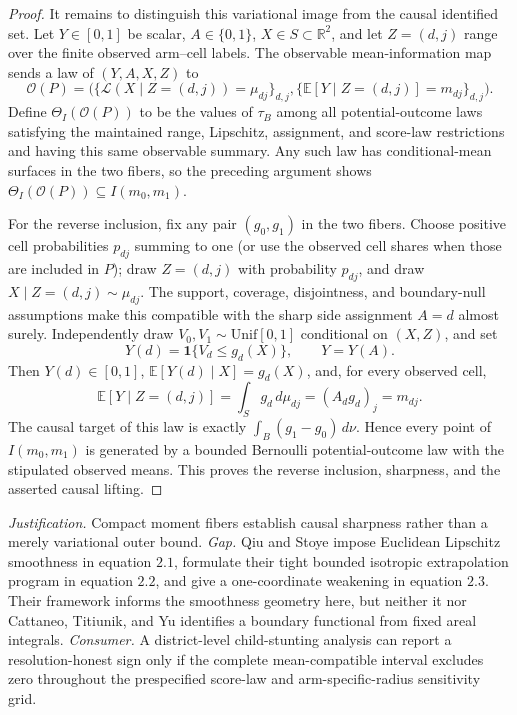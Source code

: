 \documentclass{article}
\begin{document}
\begin{proof}
It remains to distinguish this variational image from the causal identified set.
Let \(Y\in[0,1]\) be scalar, \(A\in\{0,1\}\),
\(X\in S\subset\mathbb R^2\), and let \(Z=(d,j)\) range over the finite observed
arm--cell labels.  The observable mean-information map sends a law of
\((Y,A,X,Z)\) to
\[
 \mathcal O(P)=\bigl(\{\mathcal L(X\mid Z=(d,j))=\mu_{dj}\}_{d,j},
                    \{\mathbb E[Y\mid Z=(d,j)]=m_{dj}\}_{d,j}\bigr).
\]
Define \(\Theta_I(\mathcal O(P))\) to be the values of \(\tau_B\) among all
potential-outcome laws satisfying the maintained range, Lipschitz, assignment,
and score-law restrictions and having this same observable summary.  Any such
law has conditional-mean surfaces in the two fibers, so the preceding argument
shows
\(\Theta_I(\mathcal O(P))\subseteq I(m_0,m_1)\).

For the reverse inclusion, fix any pair \((g_0,g_1)\) in the two fibers.  Choose
positive cell probabilities \(p_{dj}\) summing to one (or use the observed cell
shares when those are included in \(P\)); draw \(Z=(d,j)\) with probability
\(p_{dj}\), and draw \(X\mid Z=(d,j)\sim\mu_{dj}\).  The support, coverage,
disjointness, and boundary-null assumptions make this compatible with the sharp
side assignment \(A=d\) almost surely.  Independently draw
\(V_0,V_1\sim\mathrm{Unif}[0,1]\) conditional on \((X,Z)\), and set
\[
 Y(d)=\mathbf 1\{V_d\leq g_d(X)\},\qquad Y=Y(A).
\]
Then \(Y(d)\in[0,1]\),
\(\mathbb E[Y(d)\mid X]=g_d(X)\), and, for every observed cell,
\[
 \mathbb E[Y\mid Z=(d,j)]
 =\int_S g_d\,d\mu_{dj}=(A_dg_d)_j=m_{dj}.
\]
The causal target of this law is exactly \(\int_B(g_1-g_0)\,d\nu\).  Hence every
point of \(I(m_0,m_1)\) is generated by a bounded Bernoulli potential-outcome
law with the stipulated observed means.  This proves the reverse inclusion,
sharpness, and the asserted causal lifting.
\end{proof}
\par\smallskip\noindent \textit{Justification.} Compact moment fibers establish causal sharpness rather than a merely variational outer bound. \textit{Gap.} Qiu and Stoye impose Euclidean Lipschitz smoothness in equation \(2.1\), formulate their tight bounded isotropic extrapolation program in equation \(2.2\), and give a one-coordinate weakening in equation \(2.3\). Their framework informs the smoothness geometry here, but neither it nor Cattaneo, Titiunik, and Yu identifies a boundary functional from fixed areal integrals. \textit{Consumer.} A district-level child-stunting analysis can report a resolution-honest sign only if the complete mean-compatible interval excludes zero throughout the prespecified score-law and arm-specific-radius sensitivity grid.
\end{document}

